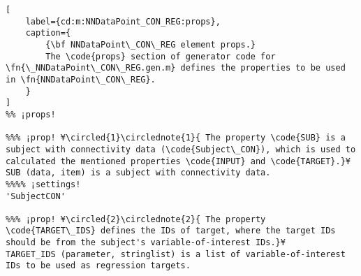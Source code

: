 \documentclass{tufte-handout}
\begin{document}
\begin{lstlisting}[
	label={cd:m:NNDataPoint_CON_REG:props},
	caption={
		{\bf NNDataPoint\_CON\_REG element props.}
		The \code{props} section of generator code for \fn{\_NNDataPoint\_CON\_REG.gen.m} defines the properties to be used in \fn{NNDataPoint\_CON\_REG}.
	}
]
%% ¡props!

%%% ¡prop! ¥\circled{1}\circlednote{1}{ The property \code{SUB} is a subject with connectivity data (\code{Subject\_CON}), which is used to calculated the mentioned properties \code{INPUT} and \code{TARGET}.}¥
SUB (data, item) is a subject with connectivity data.
%%%% ¡settings!
'SubjectCON'

%%% ¡prop! ¥\circled{2}\circlednote{2}{ The property \code{TARGET\_IDS} defines the IDs of target, where the target IDs should be from the subject's variable-of-interest IDs.}¥
TARGET_IDS (parameter, stringlist) is a list of variable-of-interest IDs to be used as regression targets.

\end{lstlisting}

\clearpage
\end{document}
